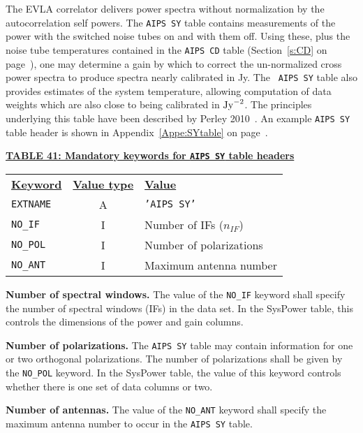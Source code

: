 \documentclass[twoside]{article}
\newcommand{\nif}{$n_{IF}$}
\begin{document}
The EVLA correlator delivers power spectra without normalization by
the autocorrelation self powers.  The {\tt AIPS SY} table contains
measurements of the power with the switched noise tubes on and with
them off.  Using these, plus the noise tube temperatures contained in
the {\tt AIPS CD} table (Section~\ref{s:CD} on page~\pageref{s:CD}),
one may determine a gain by which to correct the un-normalized cross
power spectra to produce spectra nearly calibrated in Jy.  The {\tt
  AIPS SY} table also provides estimates of the system temperature,
allowing computation of data weights which are also close to being
calibrated in ${\rm Jy}^{-2}$.  The principles underlying this table
have been described by Perley 2010~\cite{RP10}.  An example {\tt AIPS
  SY} table header is shown in Appendix~\ref{Appe:SYtable} on
page~\pageref{Appe:SYtable}.

\begin{center}
\underline{\bf{TABLE 41: Mandatory keywords for {\tt AIPS SY} table
    headers}}\\
\begin{tabular}{lcl}
\noalign{\vspace{2pt}} \label{ta:SYkeys}
\underline{{\bf Keyword}} & \underline{\bf{Value type}} &
    \underline{\bf{Value\vphantom{y}}} \\
\noalign{\vspace{2pt}}
{\tt EXTNAME}   & A & {\tt 'AIPS SY'}  \\
{\tt NO\_IF}    & I & Number of IFs (\nif)\\
{\tt NO\_POL}   & I & Number of polarizations \\
{\tt NO\_ANT}   & I & Maximum antenna number
\end{tabular}
\end{center}

{\bf Number of spectral windows.} The value of the {\tt NO\_IF}
keyword shall specify the number of spectral windows (IFs) in the data
set.  In the SysPower table, this controls the dimensions of the
power and gain columns.

{\bf Number of polarizations.}  The {\tt AIPS SY} table may contain
information for one or two orthogonal polarizations.  The number of
polarizations shall be given by the {\tt NO\_POL} keyword.   In the
SysPower table, the value of this keyword controls whether there is
one set of data columns or two.

{\bf Number of antennas.} The value of the {\tt NO\_ANT} keyword shall
specify the maximum antenna number to occur in the {\tt AIPS SY} table.
\end{document}
